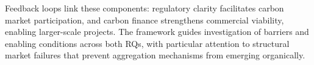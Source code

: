 Feedback loops link these components: regulatory clarity facilitates carbon market participation, and carbon finance strengthens commercial viability, enabling larger-scale projects. The framework guides investigation of barriers and enabling conditions across both RQs, with particular attention to structural market failures that prevent aggregation mechanisms from emerging organically.
